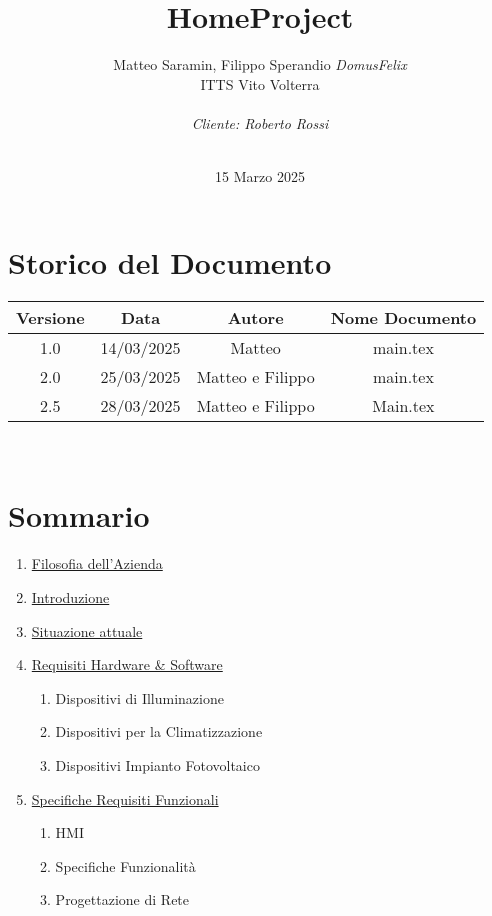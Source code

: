 \documentclass[italian, 12pt, a4paper]{article}
\title{\huge{HomeProject}}
\author{Matteo Saramin, Filippo Sperandio \textit{DomusFelix} \\ {\small ITTS Vito Volterra} \\ \\ \emph{Cliente: Roberto Rossi}}
\date{\version\\ 15 Marzo 2025}
\begin{document}
\maketitle %

\section{Storico del Documento}

\begin{center}
    \renewcommand{\arraystretch}{1.5} %
    \begin{tabular}{|c|c|c|c|}
        \hline
        \rowcolor{violet!30}
        Versione & Data & Autore & Nome Documento \\
        \hline
        1.0 & 14/03/2025 & Matteo & main.tex \\
        \hline
        2.0&25/03/2025&Matteo e Filippo & main.tex \\
        \hline
        2.5&28/03/2025&Matteo e Filippo&Main.tex\\
        \hline
    \end{tabular}\\[4mm]
\end{center}
\vspace{15mm}
\clearpage
\section{Sommario}
\begin{enumerate}
    \item \hyperref[sec:filosofia]{\Large Filosofia dell'Azienda}
    \item \hyperref[sec:introduzione]{\Large Introduzione}
    \item \hyperref[sec:situazione]{\Large Situazione attuale}
    \item \hyperref[sec:requisiti]{\Large Requisiti Hardware \& Software}
        \begin{enumerate}
            \item Dispositivi di Illuminazione
            \item Dispositivi per la Climatizzazione
            \item Dispositivi Impianto Fotovoltaico
        \end{enumerate}
    \item \hyperref[sec:requisiti2]{\Large Specifiche Requisiti Funzionali}
        \begin{enumerate}
            \item HMI
            \item Specifiche Funzionalità
            \item Progettazione di Rete
        \end{enumerate}
\end{enumerate}
\clearpage
\end{document}
